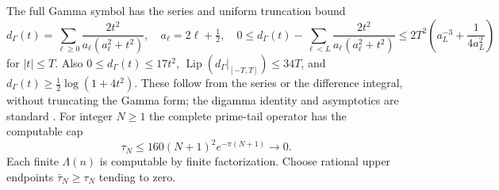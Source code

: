 \documentclass[11pt]{article}
\begin{document}
The full Gamma symbol has the series and uniform truncation bound
\begin{equation}\label{gamma}
 d_\Gamma(t)=\sum_{\ell\ge0}\frac{2t^2}{a_\ell(a_\ell^2+t^2)},\quad a_\ell=2\ell+\tfrac12,\quad
 0\le d_\Gamma(t)-\sum_{\ell<L}\frac{2t^2}{a_\ell(a_\ell^2+t^2)}\le2T^2\left(a_L^{-3}+\frac1{4a_L^2}\right)
\end{equation}
for $|t|\le T$. Also $0\le d_\Gamma(t)\le17t^2$, $\operatorname{Lip}(d_\Gamma|_{[-T,T]})\le34T$, and $d_\Gamma(t)\ge\frac12\log(1+4t^2)$. These follow from the series or the difference integral, without truncating the Gamma form; the digamma identity and asymptotics are standard \cite{dlmf}. For integer $N\ge1$ the complete prime-tail operator has the computable cap \cite{indexnote}
\begin{equation}\label{tail}
 \tau_N\le160(N+1)^2e^{-\pi(N+1)}\longrightarrow0.
\end{equation}
Each finite $\Lambda(n)$ is computable by finite factorization. Choose rational upper endpoints $\bar\tau_N\ge\tau_N$ tending to zero.
\end{document}
